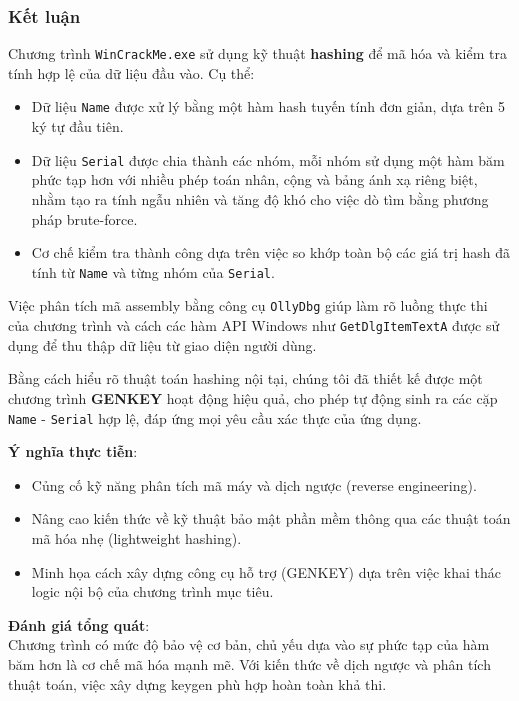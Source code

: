 \newpage
\subsubsection{Kết luận}

Chương trình \texttt{WinCrackMe.exe} sử dụng kỹ thuật \textbf{hashing} để mã hóa và kiểm tra tính hợp lệ của dữ liệu đầu vào. Cụ thể:

\begin{itemize}
    \item Dữ liệu \texttt{Name} được xử lý bằng một hàm hash tuyến tính đơn giản, dựa trên 5 ký tự đầu tiên.
    \item Dữ liệu \texttt{Serial} được chia thành các nhóm, mỗi nhóm sử dụng một hàm băm phức tạp hơn với nhiều phép toán nhân, cộng và bảng ánh xạ riêng biệt, nhằm tạo ra tính ngẫu nhiên và tăng độ khó cho việc dò tìm bằng phương pháp brute-force.
    \item Cơ chế kiểm tra thành công dựa trên việc so khớp toàn bộ các giá trị hash đã tính từ \texttt{Name} và từng nhóm của \texttt{Serial}.
\end{itemize}

Việc phân tích mã assembly bằng công cụ \texttt{OllyDbg} giúp làm rõ luồng thực thi của chương trình và cách các hàm API Windows như \texttt{GetDlgItemTextA} được sử dụng để thu thập dữ liệu từ giao diện người dùng.

Bằng cách hiểu rõ thuật toán hashing nội tại, chúng tôi đã thiết kế được một chương trình \textbf{GENKEY} hoạt động hiệu quả, cho phép tự động sinh ra các cặp \texttt{Name} - \texttt{Serial} hợp lệ, đáp ứng mọi yêu cầu xác thực của ứng dụng.

\bigskip
\noindent\textbf{Ý nghĩa thực tiễn}:
\begin{itemize}
    \item Củng cố kỹ năng phân tích mã máy và dịch ngược (reverse engineering).
    \item Nâng cao kiến thức về kỹ thuật bảo mật phần mềm thông qua các thuật toán mã hóa nhẹ (lightweight hashing).
    \item Minh họa cách xây dựng công cụ hỗ trợ (GENKEY) dựa trên việc khai thác logic nội bộ của chương trình mục tiêu.
\end{itemize}

\bigskip
\noindent\textbf{Đánh giá tổng quát}: \\
Chương trình có mức độ bảo vệ cơ bản, chủ yếu dựa vào sự phức tạp của hàm băm hơn là cơ chế mã hóa mạnh mẽ. Với kiến thức về dịch ngược và phân tích thuật toán, việc xây dựng keygen phù hợp hoàn toàn khả thi.

